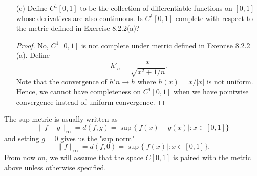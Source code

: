 \begin{enumerate}
    \item[(c)] Define \( C^1[0,1] \) to be the collection of differentiable functions on \( [0,1]  \) whose derivatives are also continuous. Is \( C^{1}[0,1] \) complete with respect to the metric defined in Exercise 8.2.2(a)?
        \begin{proof}
            No, \( C^{1}[0,1] \) is not complete under metric defined in Exercise 8.2.2 (a). Define 
            \[h'_{n} = \frac{ x  }{ \sqrt{ x^{2} + 1/n  }  }. \]
            Note that the convergence of \( h'n \to h  \) where \( h(x) = x / | x |  \) is not uniform. Hence, we cannot have completeness on \( C^{1}[0,1]  \) when we have pointwise convergence instead of uniform convergence.
        \end{proof}
\end{enumerate}

The sup metric is usually written as 
\[  \lVert f -g  \rVert_{\infty }  = d(f,g) = \sup \{ | f(x) - g(x)  | : x \in [0,1] \}  \] and setting \( g = 0  \) gives us the "sup norm" 
\[  \lVert f \rVert_{\infty } = d(f,0 ) = \sup \{ | f(x)  | : x \in [0,1] \} . \]
From now on, we will assume that the space \( C[0,1]  \) is paired with the metric above unless otherwise specified.



